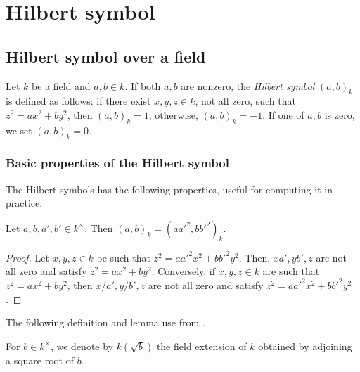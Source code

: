 
\chapter{Hilbert symbol}

\section{Hilbert symbol over a field}

\begin{definition}
	\label{def:Hilbert_symbol}
	\leanok
	Let $k$ be a field and $a, b \in k$. If both $a,b$ are nonzero, the \emph{Hilbert symbol} $(a, b)_k$ is defined as
	follows: if there exist $x, y, z \in k$, not all zero, such that $z^2 = ax^2 + by^2$,
	then $(a, b)_k = 1$; otherwise, $(a, b)_k = -1$. If one of $a,b$ is zero, we set $(a, b)_k = 0$.
\end{definition}


\subsection{Basic properties of the Hilbert symbol}

The Hilbert symbols has the following properties, useful for computing it in practice.

\begin{lemma}
	\label{lem:well_defined_up_to_squares}
	\leanok
	Let $a, b, a', b' \in k^\times$. Then $(a,b)_k = (a a'^2, b b'^2)_k$.
\end{lemma}

\begin{proof}
	Let $x, y, z \in k$ be such that $z^2 = a a'^2 x^2 + b b'^2 y^2$. Then, $xa', yb', z$ are not all
	zero and satisfy $z^2 = ax^2 + by^2$. Conversely, if $x, y, z \in k$ are such that
	$z^2 = ax^2 + by^2$, then $x/a', y/b', z$ are not all zero and satisfy
	$z^2 = a a'^2 x^2 + b b'^2 y^2$.
\end{proof}

The following definition and lemma use  from \mathlib.

\begin{definition}
	\label{def:kb}
	\leanok
	For $b \in k^\times$, we denote by $k(\sqrt{b})$ the field extension of $k$ obtained by adjoining
	a square root of $b$.
\end{definition}

